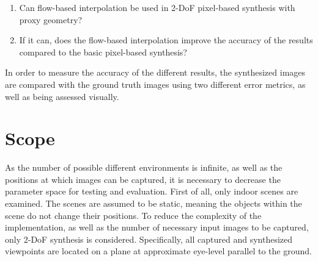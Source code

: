 \begin{enumerate}
  \item Can flow-based interpolation be used in 2-DoF pixel-based synthesis with proxy geometry?
  \item If it can, does the flow-based interpolation improve the accuracy of the results compared to the basic pixel-based synthesis?
\end{enumerate}

In order to measure the accuracy of the different results, the synthesized images are compared with the ground truth images using two different error metrics, as well as being assessed visually.


\section*{Scope}
As the number of possible different environments is infinite, as well as the positions at which images can be captured, it is necessary to decrease the parameter space for testing and evaluation. First of all, only indoor scenes are examined. The scenes are assumed to be static, meaning the objects within the scene do not change their positions. To reduce the complexity of the implementation, as well as the number of necessary input images to be captured, only 2-DoF synthesis is considered. Specifically, all captured and synthesized viewpoints are located on a plane at approximate eye-level parallel to the ground. 


